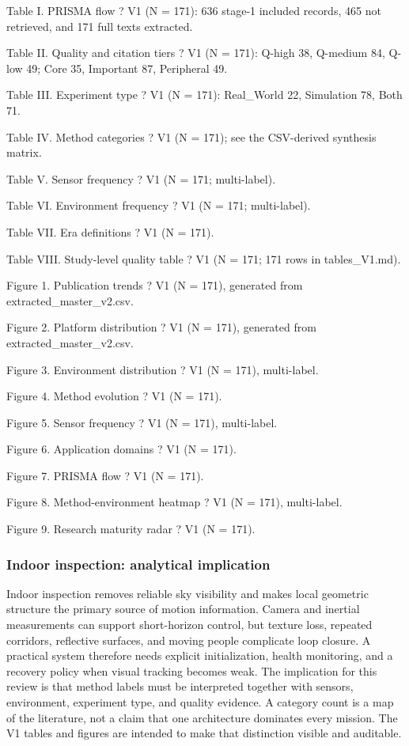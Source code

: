 \documentclass[
  journal,
  10pt]{IEEEtran}
\begin{document}
Table I. PRISMA flow ? V1 (N = 171): 636 stage-1 included records, 465
not retrieved, and 171 full texts extracted.

Table II. Quality and citation tiers ? V1 (N = 171): Q-high 38, Q-medium
84, Q-low 49; Core 35, Important 87, Peripheral 49.

Table III. Experiment type ? V1 (N = 171): Real\_World 22, Simulation
78, Both 71.

Table IV. Method categories ? V1 (N = 171); see the CSV-derived
synthesis matrix.

Table V. Sensor frequency ? V1 (N = 171; multi-label).

Table VI. Environment frequency ? V1 (N = 171; multi-label).

Table VII. Era definitions ? V1 (N = 171).

Table VIII. Study-level quality table ? V1 (N = 171; 171 rows in
tables\_V1.md).

Figure 1. Publication trends ? V1 (N = 171), generated from
extracted\_master\_v2.csv.

Figure 2. Platform distribution ? V1 (N = 171), generated from
extracted\_master\_v2.csv.

Figure 3. Environment distribution ? V1 (N = 171), multi-label.

Figure 4. Method evolution ? V1 (N = 171).

Figure 5. Sensor frequency ? V1 (N = 171), multi-label.

Figure 6. Application domains ? V1 (N = 171).

Figure 7. PRISMA flow ? V1 (N = 171).

Figure 8. Method-environment heatmap ? V1 (N = 171), multi-label.

Figure 9. Research maturity radar ? V1 (N = 171).

\subsubsection{Indoor inspection: analytical
implication}\label{indoor-inspection-analytical-implication}

Indoor inspection removes reliable sky visibility and makes local
geometric structure the primary source of motion information. Camera and
inertial measurements can support short-horizon control, but texture
loss, repeated corridors, reflective surfaces, and moving people
complicate loop closure. A practical system therefore needs explicit
initialization, health monitoring, and a recovery policy when visual
tracking becomes weak. The implication for this review is that method
labels must be interpreted together with sensors, environment,
experiment type, and quality evidence. A category count is a map of the
literature, not a claim that one architecture dominates every mission.
The V1 tables and figures are intended to make that distinction visible
and auditable.
\end{document}
